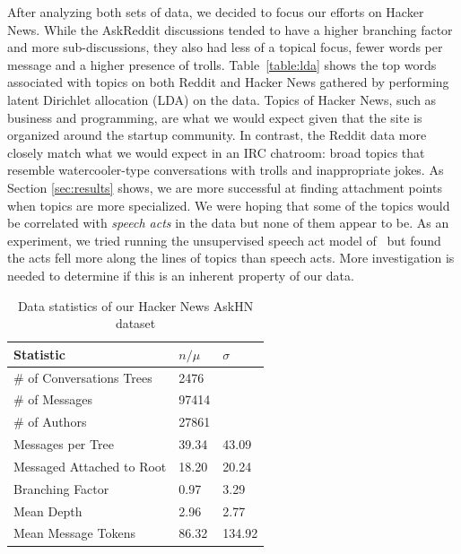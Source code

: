 \documentclass{article}
\begin{document}
After analyzing both sets of data, we decided to focus our efforts on Hacker
News. While the AskReddit discussions tended to have a higher branching factor
and more sub-discussions, they also had less of a topical focus, fewer words
per message and a higher presence of trolls. Table~\ref{table:lda} shows the
top words associated with topics on both Reddit and Hacker News gathered by
performing latent Dirichlet allocation (LDA) \cite{Blei2003} on the data.
Topics of Hacker News, such as business and programming, are what we would
expect given that the site is organized around the startup community. In
contrast, the Reddit data more closely match what we would expect in an IRC
chatroom: broad topics that resemble watercooler-type conversations with
trolls and inappropriate jokes. As Section \ref{sec:results} shows, we are
more successful at finding attachment points when topics are more specialized.
We were hoping that some of the topics would be correlated with \textit{speech
acts} in the data but none of them appear to be. As an experiment, we tried
running the unsupervised speech act model of~ but found the
acts fell more along the lines of topics than speech acts. More investigation
is needed to determine if this is an inherent property of our data.


\begin{table}[ht]\footnotesize
 \centering
 \begin{tabular}{| l | l | l |} 
   \hline
   \textbf{Statistic} & \textbf{$n / \mu$} & \textbf{$\sigma$} \\
   \hline
   \# of Conversations Trees & 2476 & \\
   \# of Messages & 97414 & \\
   \# of Authors & 27861 & \\
   Messages per Tree & 39.34 & 43.09 \\
   Messaged Attached to Root &  18.20 & 20.24 \\
   Branching Factor & 0.97 & 3.29 \\
   Mean Depth & 2.96 & 2.77 \\
   Mean Message Tokens & 86.32 & 134.92 \\
   \hline
  \end{tabular}
  \caption{Data statistics of our Hacker News AskHN dataset}
  \label{table:stats}
\end{table}
\end{document}
